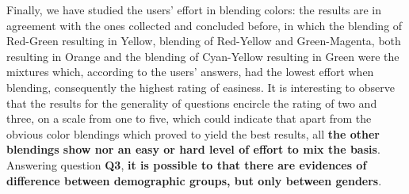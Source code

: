 %
Finally, we have studied the users' effort in blending colors: the results are in agreement with the ones collected and concluded before, in which the blending of Red-Green resulting in Yellow, blending of Red-Yellow and Green-Magenta, both resulting in Orange and the
blending of Cyan-Yellow resulting in Green were the mixtures which, according to the users’ answers, had the lowest effort when blending, consequently the highest rating of easiness. It is interesting to observe that the results for the generality of questions encircle
the rating of two and three, on a scale from one to five, which could indicate that apart from the obvious color blendings which proved to yield the best results, all \textbf{the other blendings show nor an easy or hard level of effort to mix the basis}. Answering question
\textbf{Q3}, \textbf{it is possible to that there are evidences of difference between demographic groups, but only between genders}.
%
